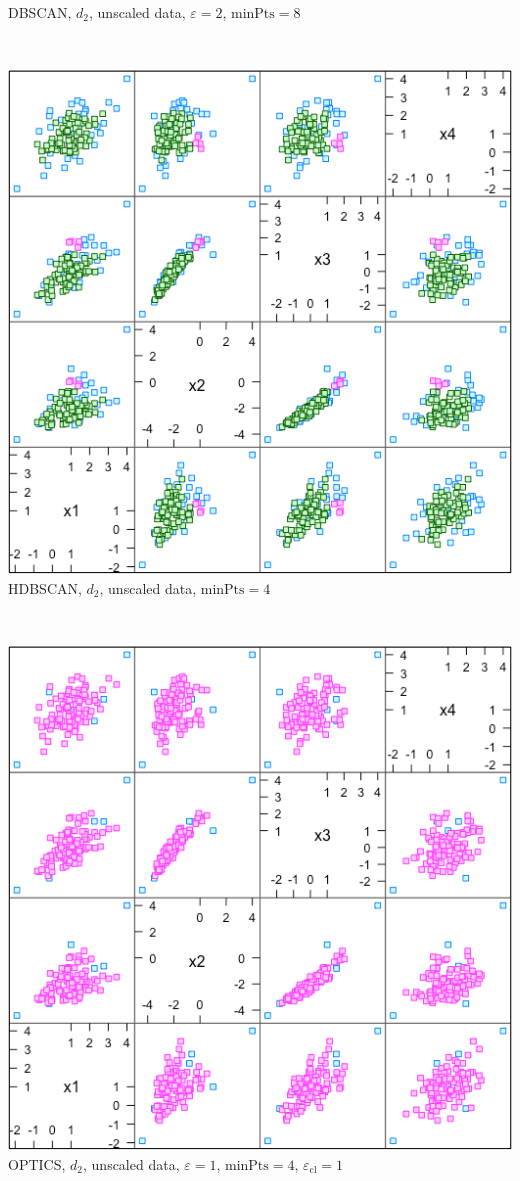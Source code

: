 \documentclass[20pt,landscape,footrule,headrule]{foils}
\begin{document}
{{\begin{center}
DBSCAN, $d_2$, unscaled data, $\varepsilon=2$, $\text{minPts}=8$
\end{center}
\newpage \ 
\begin{center}
\includegraphics[height=0.85\textheight]{Images/hdb_1} \\ 
HDBSCAN, $d_2$, unscaled data, $\text{minPts}=4$
\end{center}

\newpage \ 
\begin{center}
\includegraphics[height=0.85\textheight]{Images/opt_1} \\ 
OPTICS, $d_2$,  unscaled data, $\varepsilon=1$, $\text{minPts}=4$, $\varepsilon_{\text{cl}}=1$
\end{center}

}}
\end{document}
